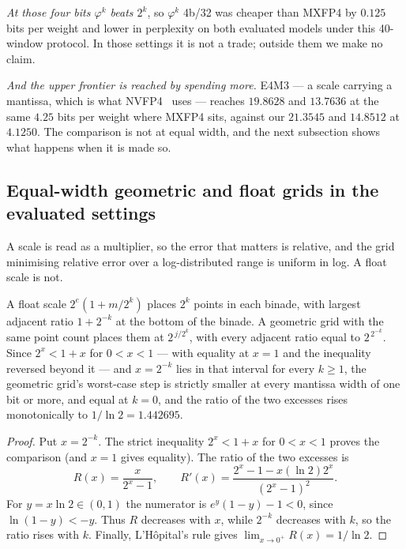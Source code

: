 \emph{At those four bits $\varphi^{k}$ beats $2^{k}$}, so $\varphi^{k}$ 4b/32
was cheaper than MXFP4 by $0.125$ bits per weight and lower in perplexity on both
evaluated models under this 40-window protocol. In those settings it is not a
trade; outside them we make no claim.

\emph{And the upper frontier is reached by spending more.} E4M3 --- a scale
carrying a mantissa, which is what NVFP4~\cite{nvfp4} uses --- reaches
$19.8628$ and $13.7636$ at the same $4.25$ bits per weight where MXFP4 sits,
against our $21.3545$ and $14.8512$ at $4.1250$. The comparison is not at equal
width, and the next subsection shows what happens when it is made so.


\subsection{Equal-width geometric and float grids in the evaluated settings}\label{sec:geoscale}


A scale is read as a multiplier, so the error that matters is relative, and the
grid minimising relative error over a log-distributed range is uniform in log.
A float scale is not.

\begin{theorem}\label{thm:geoscale}
A float scale $2^{e}(1+m/2^{k})$ places $2^{k}$ points in each binade, with
largest adjacent ratio $1+2^{-k}$ at the bottom of the binade. A geometric grid
with the same point count places them at $2^{\,j/2^{k}}$, with every adjacent
ratio equal to $2^{\,2^{-k}}$. Since $2^{x}<1+x$ for $0<x<1$ --- with equality at
$x=1$ and the inequality reversed beyond it --- and $x=2^{-k}$ lies in that
interval for every $k \ge 1$, the geometric grid's worst-case step is strictly
smaller at every mantissa width of one bit or more, and equal at $k=0$,
and the ratio of the two excesses rises monotonically to $1/\ln 2 = 1.442695$.
\end{theorem}

\begin{proof}
Put $x=2^{-k}$.  The strict inequality $2^x<1+x$ for
$0<x<1$ proves the comparison (and $x=1$ gives equality).  The ratio of
the two excesses is
\[
 R(x)=\frac{x}{2^x-1},\qquad
 R'(x)=\frac{2^x-1-x(\ln 2)2^x}{(2^x-1)^2}.
\]
For $y=x\ln 2\in(0,1)$ the numerator is
$e^y(1-y)-1<0$, since $\ln(1-y)<-y$.  Thus $R$ decreases with $x$,
while $2^{-k}$ decreases with $k$, so the ratio rises with $k$.  Finally,
L'Hôpital's rule gives $\lim_{x\to0^+}R(x)=1/\ln 2$.
\end{proof}

